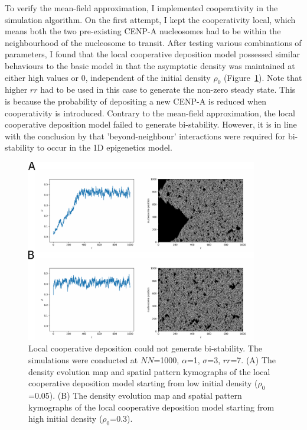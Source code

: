 To verify the mean-field approximation, I implemented cooperativity in the simulation algorithm. On the first attempt, I kept the cooperativity local, which means both the two pre-existing CENP-A nucleosomes had to be within the neighbourhood of the nucleosome to transit. After testing various combinations of parameters, I found that the local cooperative deposition model possessed similar behaviours to the basic model in that the asymptotic density was maintained at either high values or 0, independent of the initial density $\rho_{0}$ (Figure~\ref{fig:localCoop}). Note that higher $rr$ had to be used in this case to generate the non-zero steady state. This is because the probability of depositing a new CENP-A is reduced when cooperativity is introduced. Contrary to the mean-field approximation, the local cooperative deposition model failed to generate bi-stability. However, it is in line with the conclusion by \cite{Dodd2007} that 'beyond-neighbour' interactions were required for bi-stability to occur in the 1D epigenetics model. 

\begin{figure}[htbp]
  \centering
  \includegraphics[width=0.9\textwidth]{chapter2/figures/local_coop.pdf}
  \caption[Local cooperative deposition could not generate bi-stability]{Local cooperative deposition could not generate bi-stability. The simulations were conducted at $NN$=1000, $\alpha$=1, $\sigma$=3, $rr$=7. (A) The density evolution map and spatial pattern kymographs of the local cooperative deposition model starting from low initial density ($\rho_{0}$=0.05). (B) The density evolution map and spatial pattern kymographs of the local cooperative deposition model starting from high initial density ($\rho_{0}$=0.3).}
  \label{fig:localCoop}
\end{figure}

